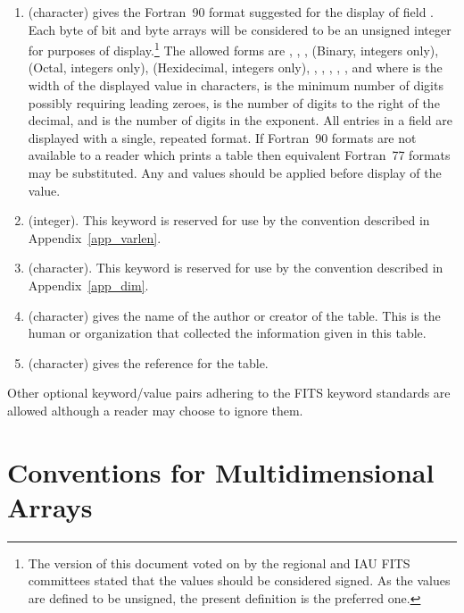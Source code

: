 \begin{enumerate}
\item {} (character) gives the Fortran~90 format
suggested for the display of field .  Each byte of bit and
byte arrays will be considered to be an unsigned integer for purposes of
display.\footnote{
The version of this document voted on by the regional and IAU FITS
committees stated that the values should be considered signed.  As the
values are defined to be unsigned, the present definition is the
preferred one.}
The allowed forms are , , ,
 (Binary, integers only),  (Octal, integers
only),  (Hexidecimal, integers only), ,
, , ,
, and  where  is the width of
the displayed value in characters,  is the minimum number of
digits possibly requiring leading zeroes,  is the number of
digits to the right of the decimal, and  is the number of
digits in the exponent.  All entries in a field are displayed with a
single, repeated format.  If Fortran~90 formats are not available to a
reader which prints a table then equivalent Fortran~77 formats may be
substituted.  Any
 and  values should be applied
before display of the value.  

\item {} (integer). This keyword is reserved for use by the
convention described in Appendix~\ref{app_varlen}.
\item {} (character). This keyword is reserved for use
by the convention described in Appendix~\ref{app_dim}.
\item {} (character) gives the name of the author or creator 
of the table. 
This is the human or organization that collected the information given
in this table.

\item {} (character) gives the reference for the table. 
\end{enumerate} %

Other optional keyword/value pairs adhering to the FITS keyword standards
are allowed although a reader may choose to ignore them.

\section{Conventions for Multidimensional Arrays}


